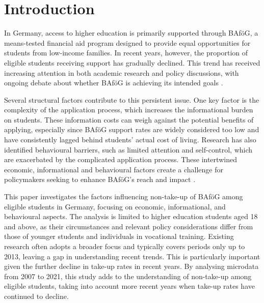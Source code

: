 \section{Introduction} \label{sec:intro}




In Germany, access to higher education is primarily supported through BAföG, a means-tested financial aid program designed to provide equal opportunities for students from low-income families. In recent years, however, the proportion of eligible students receiving support has gradually declined. This trend has received increasing attention in both academic research and policy discussions, with ongoing debate about whether BAföG is achieving its intended goals \citep{gwosc_krisenbewaltigung_2022, meier_bafog_2024}.

Several structural factors contribute to this persistent issue. One key factor is the complexity of the application process, which increases the informational burden on students. These information costs can weigh against the potential benefits of applying, especially since BAföG support rates are widely considered too low and have consistently lagged behind students’ actual cost of living. Research has also identified behavioural barriers, such as limited attention and self-control, which are exacerbated by the complicated application process. These intertwined economic, informational and behavioural factors create a challenge for policymakers seeking to enhance BAföG’s reach and impact \citep{staack_von_2017, bhargava_psychological_2015, bolland_information_nodate}.

This paper investigates the factors influencing non-take-up of BAföG among eligible students in Germany, focusing on economic, informational, and behavioural aspects. The analysis is limited to higher education students aged 18 and above, as their circumstances and relevant policy considerations differ from those of younger students and individuals in vocational training. Existing research often adopts a broader focus and typically covers periods only up to 2013, leaving a gap in understanding recent trends. This is particularly important given the further decline in take-up rates in recent years. By analysing microdata from 2007 to 2021, this study adds to the understanding of non-take-up among eligible students, taking into account more recent years when take-up rates have continued to decline.


